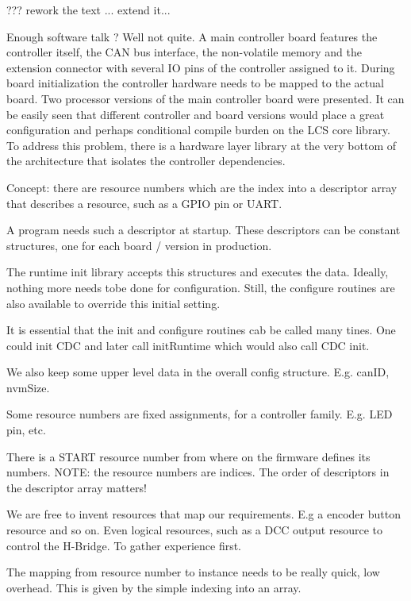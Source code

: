 

??? rework the text ... extend it...

Enough software talk ? Well not quite. A main controller board features the controller itself, the CAN bus interface, the non-volatile memory and the extension connector with several IO pins of the controller assigned to it. During board initialization the controller hardware needs to be mapped to the actual board. Two processor versions of the main controller board were presented. It can be easily seen that different controller and board versions would place a great configuration and perhaps conditional compile burden on the LCS core library. To address this problem, there is a hardware layer library at the very bottom of the architecture that isolates the controller dependencies.


Concept: there are resource numbers which are the index into a descriptor array that describes a resource, such as a GPIO pin or UART.

A program needs such a descriptor at startup. These descriptors can be constant structures, one for each board / version in production. 

The runtime init library accepts this structures and executes the data. Ideally, nothing more needs tobe done for configuration. Still, the configure routines are also available to override this initial setting.

It is essential that the init and configure routines cab be called many tines. One could init CDC and later call initRuntime which would also call CDC init. 

We also keep some upper level data in the overall config structure. E.g. canID, nvmSize.

Some resource numbers are fixed assignments, for a controller family. E.g. LED pin, etc.

There is a START resource number from where on the firmware defines its numbers.
NOTE: the resource numbers are indices. The order of descriptors in the descriptor array matters! 

We are free to invent resources that map our requirements. E.g a encoder button resource and so on. Even logical resources, such as a DCC output resource to control the H-Bridge. To gather experience first.

The mapping from resource number to instance needs to be really quick, low overhead. This is given by the simple indexing into an array.


